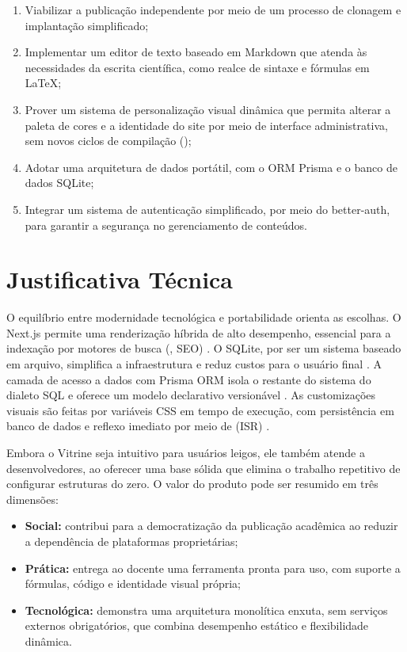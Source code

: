 \begin{enumerate}[label=\textbf{OE\arabic*.}, leftmargin=1.6cm]
  \item Viabilizar a publicação independente por meio de um processo de clonagem e implantação simplificado;
  \item Implementar um editor de texto baseado em Markdown que atenda às necessidades da escrita científica, como realce de sintaxe e fórmulas em \LaTeX{};
  \item Prover um sistema de personalização visual dinâmica que permita alterar a paleta de cores e a identidade do site por meio de interface administrativa, sem novos ciclos de compilação ();
  \item Adotar uma arquitetura de dados portátil, com o ORM Prisma e o banco de dados SQLite;
  \item Integrar um sistema de autenticação simplificado, por meio do better-auth, para garantir a segurança no gerenciamento de conteúdos.
\end{enumerate}

\section{Justificativa Técnica}\label{sec:justificativa}

O equilíbrio entre modernidade tecnológica e portabilidade orienta as escolhas. O Next.js permite uma renderização híbrida de alto desempenho, essencial para a indexação por motores de busca (, SEO) \cite{nextjsdocs}. O SQLite, por ser um sistema baseado em arquivo, simplifica a infraestrutura e reduz custos para o usuário final \cite{sqliteabout,sqlitewhentouse}. A camada de acesso a dados com Prisma ORM isola o restante do sistema do dialeto SQL e oferece um modelo declarativo versionável \cite{prismadocs}. As customizações visuais são feitas por variáveis CSS em tempo de execução, com persistência em banco de dados e reflexo imediato por meio de  (ISR) \cite{nextjsdocs}.

Embora o Vitrine seja intuitivo para usuários leigos, ele também atende a desenvolvedores, ao oferecer uma base sólida que elimina o trabalho repetitivo de configurar estruturas do zero. O valor do produto pode ser resumido em três dimensões:

\begin{itemize}
  \item \textbf{Social:} contribui para a democratização da publicação acadêmica ao reduzir a dependência de plataformas proprietárias;
  \item \textbf{Prática:} entrega ao docente uma ferramenta pronta para uso, com suporte a fórmulas, código e identidade visual própria;
  \item \textbf{Tecnológica:} demonstra uma arquitetura monolítica enxuta, sem serviços externos obrigatórios, que combina desempenho estático e flexibilidade dinâmica.
\end{itemize}

